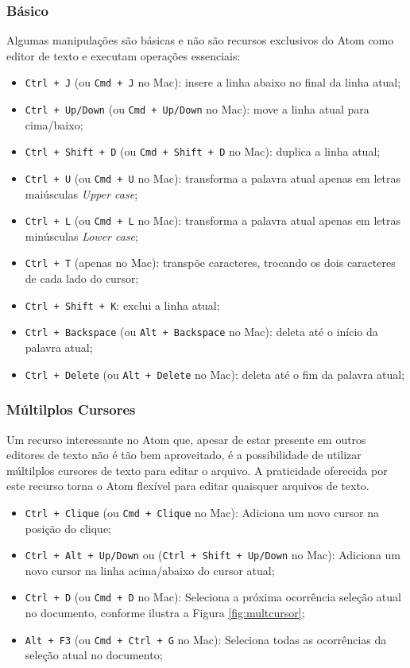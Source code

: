 	\subsubsection{Básico}
	Algumas manipulações são básicas e não são recursos exclusivos do Atom como editor de texto e executam operações essenciais:
	\begin{itemize}
		\item \verb|Ctrl + J| (ou \verb|Cmd + J| no Mac): insere a linha abaixo no final da linha atual;
		\item \verb|Ctrl + Up/Down| (ou \verb|Cmd + Up/Down| no Mac): move a linha atual para cima/baixo;
		\item \verb|Ctrl + Shift + D| (ou \verb|Cmd + Shift + D| no Mac): duplica a linha atual;
		\item \verb|Ctrl + U| (ou \verb|Cmd + U| no Mac): transforma a palavra atual apenas em letras maiúsculas \textit{Upper case};
		\item \verb|Ctrl + L| (ou \verb|Cmd + L| no Mac): transforma a palavra atual apenas em letras minúsculas \textit{Lower case};
		\item \verb|Ctrl + T| (apenas no Mac): transpõe caracteres, trocando os dois caracteres de cada lado do cursor;
		\item \verb|Ctrl + Shift + K|: exclui a linha atual;
		\item \verb|Ctrl + Backspace| (ou \verb|Alt + Backspace| no Mac): deleta até o início da palavra atual;
		\item \verb|Ctrl + Delete| (ou \verb|Alt + Delete| no Mac): deleta até o fim da palavra atual;
	\end{itemize}

	\subsubsection{Múltilplos Cursores}
	Um recurso interessante no Atom que, apesar de estar presente em outros editores de texto não é tão bem aproveitado, é a possibilidade de utilizar múltilplos cursores de texto para editar o arquivo. A praticidade oferecida por este recurso torna o Atom flexível para editar quaisquer arquivos de texto.
	\begin{itemize}
		\item \verb|Ctrl + Clique| (ou \verb|Cmd + Clique| no Mac): Adiciona um novo cursor na posição do clique;
		\item \verb|Ctrl + Alt + Up/Down| ou (\verb|Ctrl + Shift + Up/Down| no Mac): Adiciona um novo cursor na linha acima/abaixo do cursor atual;
		\item \verb|Ctrl + D| (ou \verb|Cmd + D| no Mac): Seleciona a próxima ocorrência seleção atual no documento, conforme ilustra a Figura \ref{fig:multcursor};
		\item \verb|Alt + F3| (ou \verb|Cmd + Ctrl + G| no Mac): Seleciona todas as ocorrências da seleção atual no documento;
	\end{itemize}

